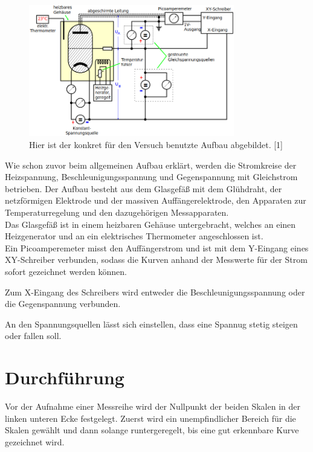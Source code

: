 \documentclass[titlepage = firstcover]{scrartcl}
\begin{document}
        \begin{figure}[h]
            \centering
            \includegraphics[width = 0.8\textwidth]{Bilder/Aufbau.png}
            \caption{Hier ist der konkret für den Versuch benutzte Aufbau abgebildet. [1]}
            \label{fig:Aufbau}
        \end{figure}

        \FloatBarrier

        Wie schon zuvor beim allgemeinen Aufbau erklärt, werden die Stromkreise der Heizspannung, Beschleunigungsspannung und Gegenspannung mit Gleichstrom betrieben.
        Der Aufbau besteht aus dem Glasgefäß mit dem Glühdraht, der netzförmigen Elektrode und der massiven Auffängerelektrode, den Apparaten zur Temperaturregelung und den dazugehörigen Messapparaten. \\

        Das Glasgefäß ist in einem heizbaren Gehäuse untergebracht, welches an einen Heizgenerator und an ein elektrisches Thermometer angeschlossen ist. \\

        Ein Picoamperemeter misst den Auffängerstrom und ist mit dem Y-Eingang eines XY-Schreiber verbunden, sodass die Kurven anhand der Messwerte für der Strom sofort gezeichnet werden können.

        Zum X-Eingang des Schreibers wird entweder die Beschleunigungsspannung oder die Gegenspannung verbunden.

        An den Spannungsquellen lässt sich einstellen, dass eine Spannug stetig steigen oder fallen soll.

    \newpage
    \section{Durchführung}
        Vor der Aufnahme einer Messreihe wird der Nullpunkt der beiden Skalen in der linken unteren Ecke festgelegt. 
        Zuerst wird ein unempfindlicher Bereich für die Skalen gewählt und dann solange runtergeregelt, bis eine gut erkennbare Kurve gezeichnet wird. \\
\end{document}

